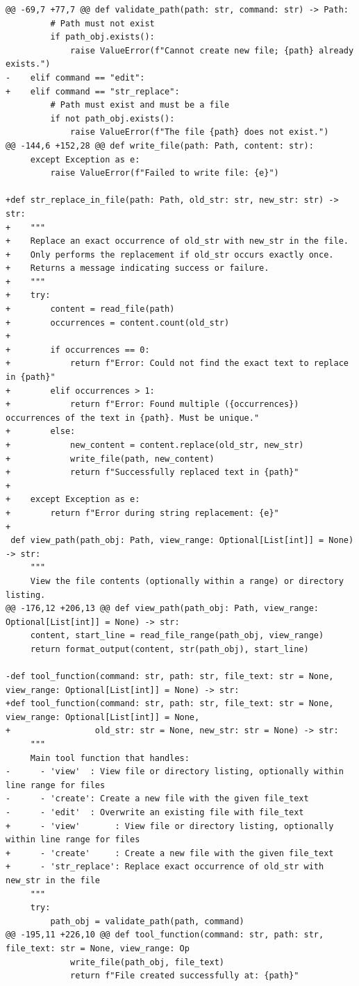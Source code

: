 \documentclass{article}
\begin{document}
\begin{lstlisting}[style=diffstyle]
@@ -69,7 +77,7 @@ def validate_path(path: str, command: str) -> Path:
         # Path must not exist
         if path_obj.exists():
             raise ValueError(f"Cannot create new file; {path} already exists.")
-    elif command == "edit":
+    elif command == "str_replace":
         # Path must exist and must be a file
         if not path_obj.exists():
             raise ValueError(f"The file {path} does not exist.")
@@ -144,6 +152,28 @@ def write_file(path: Path, content: str):
     except Exception as e:
         raise ValueError(f"Failed to write file: {e}")
 
+def str_replace_in_file(path: Path, old_str: str, new_str: str) -> str:
+    """
+    Replace an exact occurrence of old_str with new_str in the file.
+    Only performs the replacement if old_str occurs exactly once.
+    Returns a message indicating success or failure.
+    """
+    try:
+        content = read_file(path)
+        occurrences = content.count(old_str)
+        
+        if occurrences == 0:
+            return f"Error: Could not find the exact text to replace in {path}"
+        elif occurrences > 1:
+            return f"Error: Found multiple ({occurrences}) occurrences of the text in {path}. Must be unique."
+        else:
+            new_content = content.replace(old_str, new_str)
+            write_file(path, new_content)
+            return f"Successfully replaced text in {path}"
+            
+    except Exception as e:
+        return f"Error during string replacement: {e}"
+
 def view_path(path_obj: Path, view_range: Optional[List[int]] = None) -> str:
     """
     View the file contents (optionally within a range) or directory listing.
@@ -176,12 +206,13 @@ def view_path(path_obj: Path, view_range: Optional[List[int]] = None) -> str:
     content, start_line = read_file_range(path_obj, view_range)
     return format_output(content, str(path_obj), start_line)
 
-def tool_function(command: str, path: str, file_text: str = None, view_range: Optional[List[int]] = None) -> str:
+def tool_function(command: str, path: str, file_text: str = None, view_range: Optional[List[int]] = None,
+                 old_str: str = None, new_str: str = None) -> str:
     """
     Main tool function that handles:
-      - 'view'  : View file or directory listing, optionally within line range for files
-      - 'create': Create a new file with the given file_text
-      - 'edit'  : Overwrite an existing file with file_text
+      - 'view'       : View file or directory listing, optionally within line range for files
+      - 'create'     : Create a new file with the given file_text
+      - 'str_replace': Replace exact occurrence of old_str with new_str in the file
     """
     try:
         path_obj = validate_path(path, command)
@@ -195,11 +226,10 @@ def tool_function(command: str, path: str, file_text: str = None, view_range: Op
             write_file(path_obj, file_text)
             return f"File created successfully at: {path}"
 

\end{lstlisting}
\end{document}
